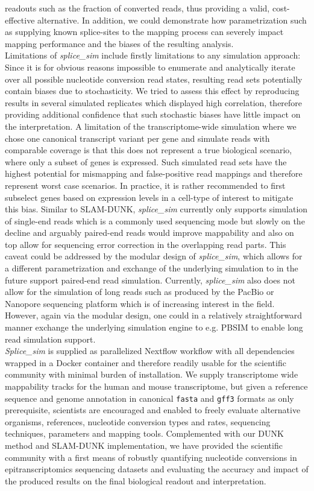 readouts such as the fraction of converted reads, thus providing a valid, cost-effective alternative. In addition, we could demonstrate how parametrization such as supplying known splice-sites to the mapping process can severely impact mapping performance and the biases of the resulting analysis. \\
Limitations of \textit{splice\_sim} include firstly limitations to any simulation approach: Since it is for obvious reasons impossible to enumerate and analytically iterate over all possible nucleotide conversion read states, resulting read sets potentially contain biases due to stochasticity. We tried to assess this effect by reproducing results in several simulated replicates which displayed high correlation, therefore providing additional confidence that such stochastic biases have little impact on the interpretation. A limitation of the transcriptome-wide simulation where we chose one canonical transcript variant per gene and simulate reads with comparable coverage is that this does not represent a true biological scenario, where only a subset of genes is expressed. Such simulated read sets have the highest potential for mismapping and false-positive read mappings and therefore represent worst case scenarios. In practice, it is rather recommended to first subselect genes based on expression levels in a cell-type of interest to mitigate this bias. Similar to SLAM-DUNK, \textit{splice\_sim} currently only supports simulation of single-end reads which is a commonly used sequencing mode but slowly on the decline and arguably paired-end reads would improve mappability and also on top allow for sequencing error correction in the overlapping read parts. This caveat could be addressed by the modular design of \textit{splice\_sim}, which allows for a different parametrization and exchange of the underlying simulation to in the future support paired-end read simulation. Currently, \textit{splice\_sim} also does not allow for the simulation of long reads such as produced by the PacBio or Nanopore sequencing platform which is of increasing interest in the field. However, again via the modular design, one could in a relatively straightforward manner exchange the underlying simulation engine to e.g. PBSIM to enable long read simulation support. \\
\textit{Splice\_sim} is supplied as parallelized Nextflow workflow with all dependencies wrapped in a Docker container and therefore readily usable for the scientific community with minimal burden of installation. We supply transcriptome wide mappability tracks for the human and mouse transcriptome, but given a reference sequence and genome annotation in canonical \texttt{fasta} and \texttt{gff3} formats as only prerequisite, scientists are encouraged and enabled to freely evaluate alternative organisms, references, nucleotide conversion types and rates, sequencing techniques, parameters and mapping tools. Complemented with our DUNK method and SLAM-DUNK implementation, we have provided the scientific community with a first means of robustly quantifying nucleotide conversions in epitranscriptomics sequencing datasets and evaluating the accuracy and impact of the produced results on the final biological readout and interpretation.